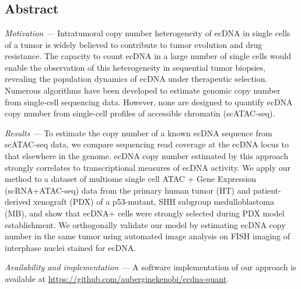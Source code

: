 \chapter{\singlecelltitle}
\label{chap:heterogeneity}
\glsresetall
\clearpage

\section{Abstract}
\par\textit{Motivation ---} Intratumoral copy number heterogeneity of \gls{ecDNA} in single cells of a tumor is widely believed to contribute to tumor evolution and drug resistance. The capacity to count ecDNA in a large number of single cells would enable the observation of this heterogeneity in sequential tumor biopsies, revealing the population dynamics of ecDNA under therapeutic selection. Numerous algorithms have been developed to estimate genomic copy number from single-cell sequencing data. However, none are designed to quantify ecDNA copy number from single-cell profiles of accessible chromatin (scATAC-seq).
\par\textit{Results ---} To estimate the copy number of a known ecDNA sequence from scATAC-seq data, we compare sequencing read coverage at the ecDNA locus to that elsewhere in the genome. \gls{ecDNA} copy number estimated by this approach strongly correlates to transcriptional measures of ecDNA activity. We apply our method to a dataset of multiome single cell ATAC + Gene Expression (scRNA+ATAC-seq) data from the primary human tumor (HT) and patient-derived xenograft (PDX) of a p53-mutant, SHH subgroup medulloblastoma (MB), and show that \gls{ecDNA+} cells were strongly selected during PDX model establishment. We orthogonally validate our model by estimating ecDNA copy number in the same tumor using automated image analysis on FISH imaging of interphase nuclei stained for ecDNA.
\par\textit{Availability and implementation ---} A software implementation of our approach is available at \url{ https://github.com/auberginekenobi/ecdna-quant}.

